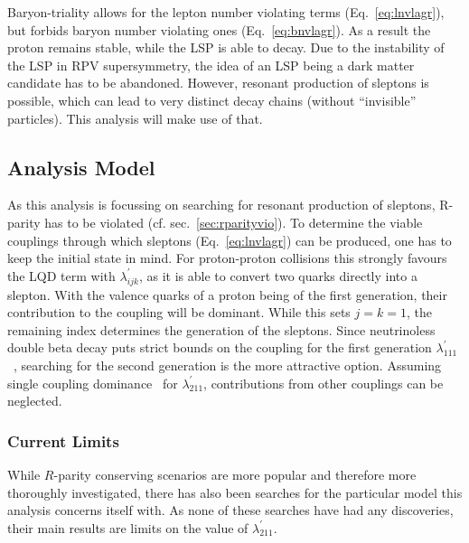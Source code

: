 Baryon-triality allows for the lepton number violating terms (Eq.~\ref{eq:lnvlagr}), but forbids baryon number violating ones (Eq.~\ref{eq:bnvlagr}). As a result the proton remains stable, while the LSP is able to decay. Due to the instability of the LSP in RPV supersymmetry, the idea of an LSP being a dark matter candidate has to be abandoned. However, resonant production of sleptons is possible, which can lead to very distinct decay chains (without ``invisible'' particles). This analysis will make use of that.


\subsection{Analysis Model}
\label{sec:anamodel}

As this analysis is focussing on searching for resonant production of sleptons, R-parity has to be violated (cf. sec.~\ref{sec:rparityvio}). To determine the viable couplings through which sleptons (Eq.~\ref{eq:lnvlagr}) can be produced, one has to keep the initial state in mind. For proton-proton collisions this strongly favours the LQD term with $\lambda^\prime_{ijk}$, as it is able to convert two quarks directly into a slepton. With the valence quarks of a proton being of the first generation, their contribution to the coupling will be dominant. While this sets $j = k = 1$, the remaining index determines the generation of the sleptons. Since neutrinoless double beta decay puts strict bounds on the coupling for the first generation $\lambda^\prime_{111}$~\cite{rpvimpl}, searching for the second generation is the more attractive option. Assuming single coupling dominance~\cite{rpvimpl} for $\lambda^\prime_{211}$, contributions from other couplings can be neglected.

\subsubsection{Current Limits}

While $R$-parity conserving scenarios are more popular and therefore more thoroughly investigated, there has also been searches for the particular model this analysis concerns itself with. As none of these searches have had any discoveries, their main results are limits on the value of $\lambda^\prime_{211}$.

